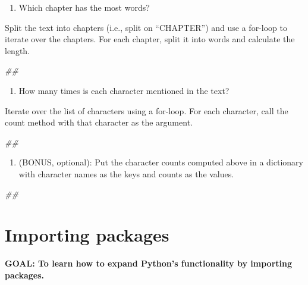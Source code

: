 \documentclass[
]{book}
\newenvironment{Shaded}{\begin{snugshade}}{\end{snugshade}}
\newcommand{\CommentTok}[1]{\textcolor[rgb]{0.56,0.35,0.01}{\textit{#1}}}
\providecommand{\tightlist}{%
  \setlength{\itemsep}{0pt}\setlength{\parskip}{0pt}}
\begin{document}
\begin{enumerate}
\def\labelenumi{\arabic{enumi}.}
\setcounter{enumi}{1}
\tightlist
\item
  Which chapter has the most words?
\end{enumerate}

Split the text into chapters (i.e., split on ``CHAPTER'') and use a for-loop to iterate over the chapters.
For each chapter, split it into words and calculate the length.

\begin{Shaded}
\begin{Highlighting}[]
\CommentTok{##}
\end{Highlighting}
\end{Shaded}

\begin{enumerate}
\def\labelenumi{\arabic{enumi}.}
\setcounter{enumi}{2}
\tightlist
\item
  How many times is each character mentioned in the text?
\end{enumerate}

Iterate over the list of characters using a for-loop.
For each character, call the count method with that character as the argument.

\begin{Shaded}
\begin{Highlighting}[]
\CommentTok{##}
\end{Highlighting}
\end{Shaded}

\begin{enumerate}
\def\labelenumi{\arabic{enumi}.}
\setcounter{enumi}{3}
\tightlist
\item
  (BONUS, optional): Put the character counts computed
  above in a dictionary with character names as the keys and
  counts as the values.
\end{enumerate}

\begin{Shaded}
\begin{Highlighting}[]
\CommentTok{##}
\end{Highlighting}
\end{Shaded}

\hypertarget{importing-packages}{%
\section{Importing packages}\label{importing-packages}}

\textbf{GOAL: To learn how to expand Python's functionality by importing packages.}
\end{document}
